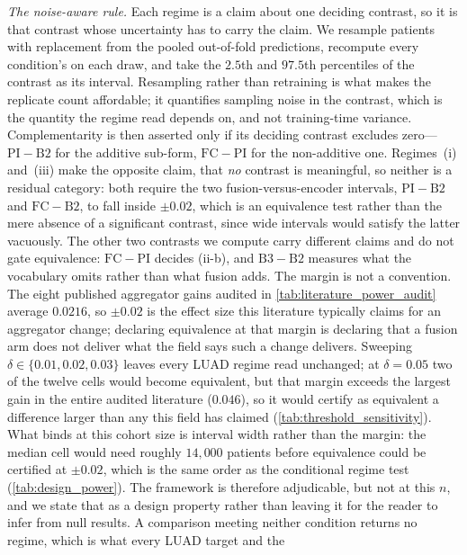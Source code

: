 \emph{The noise-aware rule.} Each regime is a claim about one deciding
contrast, so it is that contrast whose uncertainty has to carry the
claim. We resample patients with replacement from the pooled out-of-fold
predictions, recompute every condition's \auroc{} on each draw, and take
the $2.5$th and $97.5$th percentiles of the contrast as its interval.
Resampling rather than retraining is what makes the replicate count
affordable; it quantifies sampling noise in the contrast, which is the
quantity the regime read depends on, and not training-time variance.
Complementarity is then asserted only if its deciding contrast excludes
zero---$\mathrm{PI}-\mathrm{B2}$ for the additive sub-form,
$\mathrm{FC}-\mathrm{PI}$ for the non-additive one. Regimes~(i)
and~(iii) make the opposite claim, that \emph{no} contrast is meaningful,
so neither is a residual category: both require the two fusion-versus-encoder
intervals, $\mathrm{PI}-\mathrm{B2}$ and $\mathrm{FC}-\mathrm{B2}$, to fall
inside $\pm0.02$, which is an equivalence test rather than the mere
absence of a significant contrast, since wide intervals would satisfy the
latter vacuously. The other two contrasts we compute carry different claims
and do not gate equivalence: $\mathrm{FC}-\mathrm{PI}$ decides (ii-b), and
$\mathrm{B3}-\mathrm{B2}$ measures what the vocabulary omits rather than what
fusion adds.
The margin is not a convention. The eight published aggregator gains audited
in \cref{tab:literature_power_audit} average $0.0216$, so $\pm0.02$ is the
effect size this literature typically claims for an aggregator change;
declaring equivalence at that margin is declaring that a fusion arm does not
deliver what the field says such a change delivers. Sweeping
$\delta\!\in\!\{0.01,0.02,0.03\}$ leaves every LUAD regime read unchanged; at
$\delta\!=\!0.05$ two of the twelve cells would become equivalent, but that
margin exceeds the largest gain in the entire audited literature ($0.046$), so
it would certify as equivalent a difference larger than any this field has
claimed (\cref{tab:threshold_sensitivity}). What binds at this cohort size is
interval width rather than the margin: the median cell would need roughly
$14{,}000$ patients before equivalence could be certified at $\pm0.02$, which
is the same order as the conditional regime test
(\cref{tab:design_power}). The framework is therefore adjudicable, but not at
this $n$, and we state that as a design property rather than leaving it for
the reader to infer from null results. A comparison meeting neither
condition returns no regime, which is what every LUAD target and the
